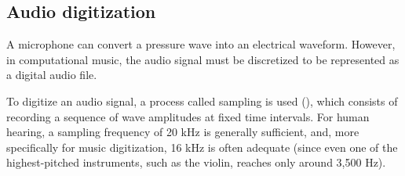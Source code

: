 \documentclass[sigconf,natbib=false]{acmart}
\begin{document}



\subsection{Audio digitization}

A microphone can convert a pressure wave into an electrical waveform. However, in computational music, the audio signal must be discretized to be represented as a digital audio file.


To digitize an audio signal, a process called sampling is used (\textcite{po2022sampling}), which consists of recording a sequence of wave amplitudes at fixed time intervals. For human hearing, a sampling frequency of 20 kHz is generally sufficient, and, more specifically for music digitization, 16 kHz is often adequate (since even one of the highest-pitched instruments, such as the violin, reaches only around 3,500 Hz).



\end{document}
